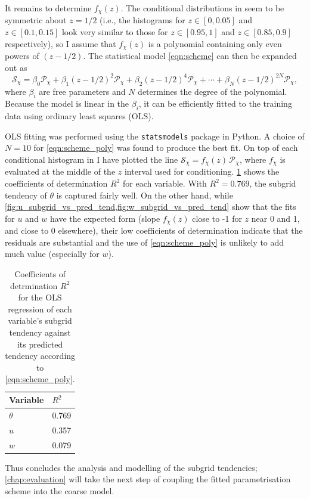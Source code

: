 \documentclass[../main.tex]{subfiles}
\begin{document}
It remains to determine $f_\chi(z)$. The conditional distributions in
seem to be symmetric about $z=1/2$ (i.e., the histograms for $z \in [0, 0.05]$
and $z \in [0.1, 0.15]$ look very similar to those for $z \in [0.95, 1]$ and $z
\in [0.85, 0.9]$ respectively), so I assume that $f_\chi(z)$ is a polynomial
containing only even powers of $(z - 1/2)$. The statistical model
\cref{eqn:scheme} can then be expanded out as
\begin{equation} \label{eqn:scheme_poly}
    \mathcal{S}_\chi =
        \beta_0 \mathcal{P}_\chi + \beta_1 (z - 1/2)^2 \mathcal{P}_\chi
        + \beta_2 (z - 1/2)^4 \mathcal{P}_\chi + \cdots
        + \beta_N (z - 1/2)^{2N} \mathcal{P}_\chi,
\end{equation}
where $\beta_i$ are free parameters and $N$ determines the degree of the
polynomial. Because the model is linear in the $\beta_i$, it can be
efficiently fitted to the training data using ordinary least squares (OLS).

OLS fitting was performed using the \texttt{statsmodels} package in Python. A
choice of $N = 10$ for \cref{eqn:scheme_poly} was found to produce the best
fit. On top of each conditional histogram in
I have plotted the line $\mathcal{S}_\chi =  f_\chi(z)\,\mathcal{P}_\chi$,
where $f_\chi$ is evaluated at the middle of the $z$ interval used for
conditioning. \cref{tab:r_squared} shows the coefficients of determination
$R^2$ for each variable. With $R^2 = 0.769$, the subgrid tendency of $\theta$
is captured fairly well. On the other hand, while
\cref{fig:u_subgrid_vs_pred_tend,fig:w_subgrid_vs_pred_tend} show that the fits
for $u$ and $w$ have the expected form (slope $f_\chi(z)$ close to -1 for $z$
near 0 and 1, and close to 0 elsewhere), their low coefficients of
determination indicate that the residuals are substantial and the use of
\cref{eqn:scheme_poly} is unlikely to add much value (especially for $w$).

\begin{table}[ht]
\centering
\begin{tabular}{l l}
    \toprule
    Variable & $R^2$ \\
    \midrule
    $\theta$ & 0.769 \\
    $u$ & 0.357 \\
    $w$ & 0.079 \\
    \bottomrule
\end{tabular}
\caption{
    Coefficients of detrmination $R^2$ for the OLS regression of each
    variable's subgrid tendency against its predicted tendency according to
    \cref{eqn:scheme_poly}.
}
\label{tab:r_squared}
\end{table}

Thus concludes the analysis and modelling of the subgrid tendencies;
\cref{chap:evaluation} will take the next step of coupling the fitted
parametrisation scheme into the coarse model.


\ifSubfilesClassLoaded{%
    \emergencystretch=5em
    \printbibliography{}
}{}
\end{document}

